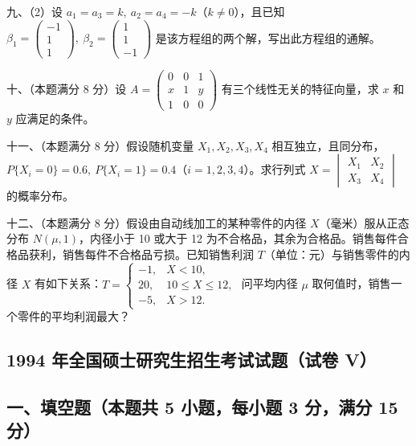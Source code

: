 \documentclass[UTF8,12pt]{ctexart}
\begin{document}
九、（2）设 \(\displaystyle a_1=a_3=k,\allowbreak \ a_2=a_4=-k\)（\(\displaystyle k\ne0\)），且已知 \(\displaystyle \beta_1=\begin{pmatrix}-1\\1\\1\end{pmatrix},\allowbreak \ \beta_2=\begin{pmatrix}1\\1\\-1\end{pmatrix}\) 是该方程组的两个解，写出此方程组的通解。


十、（本题满分 8 分）设 \(\displaystyle A=\begin{pmatrix}0&0&1\\x&1&y\\1&0&0\end{pmatrix}\) 有三个线性无关的特征向量，求 \(\displaystyle x\) 和 \(\displaystyle y\) 应满足的条件。


十一、（本题满分 8 分）假设随机变量 \(\displaystyle X_1,\allowbreak X_2,\allowbreak X_3,\allowbreak X_4\) 相互独立，且同分布，\(\displaystyle P\{X_i=0\}=0.6,\allowbreak \ P\{X_i=1\}=0.4\)（\(\displaystyle i=1,\allowbreak 2,\allowbreak 3,\allowbreak 4\)）。求行列式 \(\displaystyle X=\begin{vmatrix}X_1&X_2\\X_3&X_4\end{vmatrix}\) 的概率分布。


十二、（本题满分 8 分）假设由自动线加工的某种零件的内径 \(\displaystyle X\)（毫米）服从正态分布 \(\displaystyle N(\mu,\allowbreak 1)\)，内径小于 10 或大于 12 为不合格品，其余为合格品。销售每件合格品获利，销售每件不合格品亏损。已知销售利润 \(\displaystyle T\)（单位：元）与销售零件的内径 \(\displaystyle X\) 有如下关系：\(\displaystyle T=\begin{cases}-1,\allowbreak &X<10,\allowbreak \\20,\allowbreak &10\leq X\leq12,\allowbreak \\-5,\allowbreak &X>12.\end{cases}\) 问平均内径 \(\displaystyle \mu\) 取何值时，销售一个零件的平均利润最大？


\subsection*{1994 年全国硕士研究生招生考试试题（试卷 V）}

\subsection*{一、填空题（本题共 5 小题，每小题 3 分，满分 15 分）}
\end{document}
